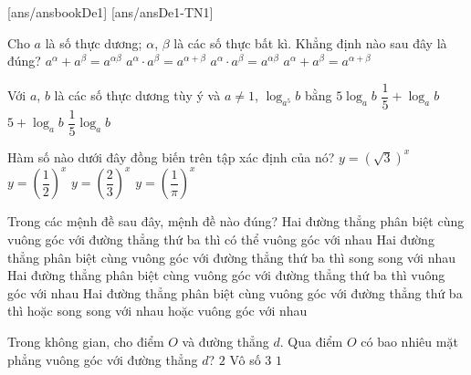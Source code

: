 \begin{name}
	{\tenchude}
	{\tendethi}
	{\tentruong}
	{\thoigian}
\end{name}
[ans/ansbookDe1]
\TN
{}[ans/ansDe1-TN1]
\begin{ex}%
	Cho $a$ là số thực dương; $\alpha$, $\beta$ là các số thực bất kì. Khẳng định nào sau đây là đúng?
	\choice
	{$a^\alpha + a^\beta = a^{\alpha\beta}$}
	{\True $a^\alpha\cdot a^\beta = a^{\alpha + \beta}$}
	{$a^\alpha\cdot a^\beta = a^{\alpha\beta}$}
	{$a^\alpha + a^\beta = a^{\alpha + \beta}$}
	\end{ex}

\begin{ex}%
Với $a$, $b$ là các số thực dương tùy ý và $a\ne 1$, $\log_{a^5}b$ bằng
\choice
{$5\log_ab$}
{$\dfrac{1}{5}+\log_ab$}
{$5+\log_ab$}
{\True $\dfrac{1}{5}\log_ab$}
\end{ex}

\begin{ex}%
Hàm số nào dưới đây đồng biến trên tập xác định của nó?
\choice
{\True $y=\left(\sqrt{3}\right)^x$}
{$y=\left(\dfrac{1}{2}\right)^x$}
{$y=\left(\dfrac{2}{3}\right)^x$}
{$y=\left(\dfrac{1}{\pi}\right)^x$}
\end{ex}

\begin{ex}%
Trong các mệnh đề sau đây, mệnh đề nào đúng?
\choice
{\True Hai đường thẳng phân biệt cùng vuông góc với đường thẳng thứ ba thì có thể vuông góc với nhau}
{Hai đường thẳng phân biệt cùng vuông góc với đường thẳng thứ ba thì song song với nhau}
{Hai đường thẳng phân biệt cùng vuông góc với đường thẳng thứ ba thì vuông góc với nhau}
{Hai đường thẳng phân biệt cùng vuông góc với đường thẳng thứ ba thì hoặc song song với nhau hoặc vuông góc với nhau}
\end{ex}

\begin{ex}%
Trong không gian, cho điểm $O$ và đường thẳng $d$. Qua điểm $O$ có bao nhiêu mặt phẳng vuông góc với đường thẳng $d$?
\choice
{$2$}
{Vô số}
{$3$}
{\True $1$}
\end{ex}

